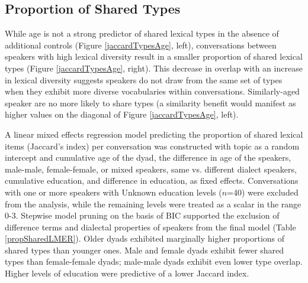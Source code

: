 \documentclass[10pt,letterpaper]{article}
\begin{document}
\subsection{Proportion of Shared Types}
While age is not a strong predictor of shared lexical types in the absence of additional controls (Figure \ref{jaccardTypesAge}, left), conversations between speakers with high lexical diversity result in a smaller proportion of shared lexical types (Figure \ref{jaccardTypesAge}, right). This decrease in overlap with an increase in lexical diversity suggests speakers do not draw from the same set of types when they exhibit more diverse vocabularies within conversations. Similarly-aged speaker are no more likely to share types (a similarity benefit would manifest as higher values on the diagonal of Figure \ref{jaccardTypesAge}, left).

A linear mixed effects regression model predicting the proportion of shared lexical items (Jaccard's index) per conversation was constructed with topic as a random intercept and cumulative age of the dyad,  the difference in age of the speakers,  male-male, female-female, or mixed speakers, same vs. different dialect speakers, cumulative education, and difference in education, as fixed effects. 
Conversations with one or more speakers with Unknown education levels ($n$=40) were excluded from the analysis, while the remaining levels were treated as a scalar in the range 0-3.
Stepwise model pruning on the basis of BIC supported the exclusion of difference terms and dialectal properties of speakers from the final model (Table \ref{propSharedLMER}).
Older dyads exhibited marginally higher proportions of shared types than younger ones. Male and female dyads exhibit fewer shared types than female-female dyads; male-male dyads exhibit even lower type overlap. Higher levels of education were predictive of a lower Jaccard index. 


\end{document}
